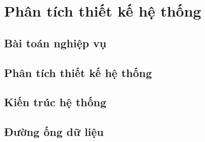 
\newpage
\section{Phân tích thiết kế hệ thống}

\lipsum[1]


\subsection{Bài toán nghiệp vụ}


\lipsum[1]


\subsection{Phân tích thiết kế hệ thống}


\lipsum[1]


\subsection{Kiến trúc hệ thống}


\lipsum[1]


\subsection{Đường ống dữ liệu}


\lipsum[1]
